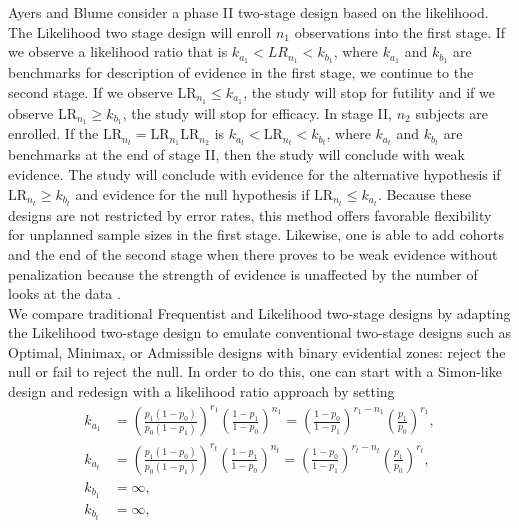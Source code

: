\documentclass[12pt]{report}\usepackage[]{graphicx}\usepackage[]{color}
\newlength{\li}\setlength{\li}{14.48pt}
\newlength{\di}\setlength{\di}{-3.5mm}
\begin{document}
\indent Ayers and Blume \cite{Ayers} consider a phase II two-stage design based on the likelihood. The Likelihood two stage design will enroll $n_1$ observations into the first stage. If we observe a likelihood ratio that is $k_{a_1} < LR_{n_1} < k_{b_1}$, where $k_{a_1}$ and $k_{b_1}$ are benchmarks for description of evidence in the first stage, we continue to the second stage. If we observe $\mbox{LR}_{n_1} \leq k_{a_1}$, the study will stop for futility and if we observe $\mbox{LR}_{n_1} \geq k_{b_1}$, the study will stop for efficacy. In stage II, $n_2$ subjects are enrolled. If the $\mbox{LR}_{n_t} = \mbox{LR}_{n_1}\mbox{LR}_{n_2}$ is $k_{a_t} < \mbox{LR}_{n_t} < k_{b_t}$, where $k_{a_t}$ and $k_{b_t}$ are benchmarks at the end of stage II, then the study will conclude with weak evidence. The study will conclude with evidence for the alternative hypothesis if $\mbox{LR}_{n_t} \geq k_{b_t}$ and evidence for the null hypothesis if $\mbox{LR}_{n_t} \leq k_{a_t}$. Because these designs are not restricted by error rates, this method offers favorable flexibility for unplanned sample sizes in the first stage. Likewise, one is able to add cohorts and the end of the second stage when there proves to be weak evidence without penalization because the strength of evidence is unaffected by the number of looks at the data \cite{Blume2002}. \\

\indent We compare traditional Frequentist and Likelihood two-stage designs by adapting the Likelihood two-stage design to emulate conventional two-stage designs such as Optimal, Minimax, or Admissible designs with binary evidential zones: reject the null or fail to reject the null. In order to do this, one can start with a Simon-like design and redesign with a likelihood ratio approach by setting
\begin{equation}
\begin{aligned}
k_{a_1} &= \left(\frac{p_1(1-p_0)}{p_0(1-p_1)}\right)^{r_1} \left(\frac{1-p_1}{1-p_0}\right)^{n_1} = \left(\frac{1-p_0}{1-p_1}\right)^{r_1-n_1} \left(\frac{p_1}{p_0}\right)^{r_1},\\ 
k_{a_t}  &= \left(\frac{p_1(1-p_0)}{p_0(1-p_1)}\right)^{r_t} \left(\frac{1-p_1}{1-p_0}\right)^{n_t} = \left(\frac{1-p_0}{1-p_1}\right)^{r_t-n_t} \left(\frac{p_1}{p_0}\right)^{r_t},\\ k_{b_1} &= \infty, \\
k_{b_t} &= \infty,
\end{aligned}
\end{equation}
\end{document}
